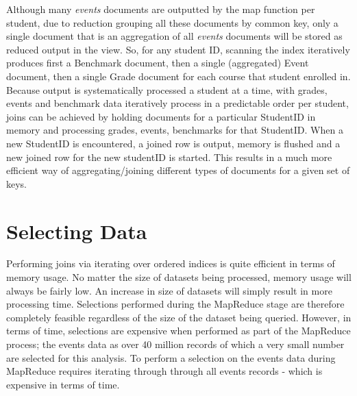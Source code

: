 Although many \textit{events} documents are outputted by the map function per student, due to reduction grouping all these documents by common key, only a single document that is an aggregation of all \textit{events} documents will be stored as reduced output in the view. So, for any student ID, scanning the index iteratively produces first a Benchmark document, then a single (aggregated) Event document, then a single Grade document for each course that student enrolled in. Because output is systematically processed a student at a time, with grades, events and benchmark data iteratively process in a predictable order per student, joins can be achieved by holding documents for a particular StudentID in memory and processing grades, events, benchmarks for that StudentID. When a new StudentID is encountered, a joined row is output, memory is flushed and a new joined row for the new studentID is started. This results in a much more efficient way of aggregating/joining different types of documents for a given set of keys.



\section{Selecting Data}
Performing joins via iterating over ordered indices is quite efficient in terms of memory usage. No matter the size of datasets being processed, memory usage will always be fairly low. An increase in size of datasets will simply result in more processing time. Selections performed during the MapReduce stage are therefore completely feasible regardless of the size of the dataset being queried. However, in terms of time, selections are expensive when performed as part of the MapReduce process; the events data as over 40 million records of which a very small number are selected for this analysis. To perform a selection on the events data during MapReduce requires iterating through through all events records - which is expensive in terms of time.

